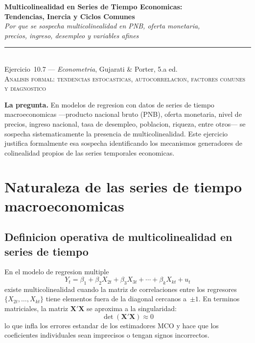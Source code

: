 \documentclass[12pt, letterpaper]{article}
\theoremstyle{remark}
\begin{document}
\begin{center}
  {\LARGE\bfseries Multicolinealidad en Series de Tiempo Economicas:}\\[6pt]
  {\LARGE\bfseries Tendencias, Inercia y Ciclos Comunes}\\[12pt]
  {\large\itshape Por que se sospecha multicolinealidad en PNB, oferta monetaria,}\\
  {\large\itshape precios, ingreso, desempleo y variables afines}\\[14pt]
  \rule{0.55\linewidth}{0.6pt}\\[8pt]
  {\normalsize Ejercicio~10.7 --- \textit{Econometria}, Gujarati \& Porter, 5.a ed.}\\[4pt]
  {\small\textsc{Analisis formal: tendencias estocasticas, autocorrelacion, factores comunes y diagnostico}}
\end{center}

\vspace{10pt}

\noindent\textbf{La pregunta.}\quad
En modelos de regresion con datos de series de tiempo macroeconomicas ---producto
nacional bruto (PNB), oferta monetaria, nivel de precios, ingreso nacional,
tasa de desempleo, poblacion, riqueza, entre otros--- se sospecha sistematicamente
la presencia de multicolinealidad. Este ejercicio justifica formalmente esa
sospecha identificando los mecanismos generadores de colinealidad propios de
las series temporales economicas.

\section{Naturaleza de las series de tiempo macroeconomicas}

\subsection{Definicion operativa de multicolinealidad en series de tiempo}

En el modelo de regresion multiple
\begin{equation}
  Y_t = \beta_1 + \beta_2 X_{2t} + \beta_3 X_{3t} + \cdots + \beta_k X_{kt} + u_t
  \label{eq:modelo}
\end{equation}
existe multicolinealidad cuando la matriz de correlaciones entre los regresores
$\{X_{2t}, \ldots, X_{kt}\}$ tiene elementos fuera de la diagonal cercanos
a~$\pm 1$. En terminos matriciales, la matriz $\mathbf{X'X}$ se aproxima a la
singularidad:
\begin{equation}
  \det(\mathbf{X'X}) \approx 0
  \label{eq:det}
\end{equation}
lo que infla los errores estandar de los estimadores MCO y hace que los
coeficientes individuales sean imprecisos o tengan signos incorrectos.
\end{document}
